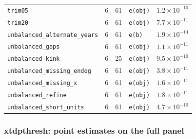 \begin{longtable}{@{}p{3.6cm}rrp{4.9cm}r@{}}
\texttt{trim05} & 6 & 61 & \texttt{e(obj)} & $1.2\times10^{-10}$ \\
\texttt{trim20} & 6 & 61 & \texttt{e(obj)} & $7.7\times10^{-11}$ \\
\texttt{unbalanced\_\allowbreak{}alternate\_\allowbreak{}years} & 6 & 61 & \texttt{e(b)} & $1.9\times10^{-14}$ \\
\texttt{unbalanced\_\allowbreak{}gaps} & 6 & 61 & \texttt{e(obj)} & $1.1\times10^{-11}$ \\
\texttt{unbalanced\_\allowbreak{}kink} & 6 & 25 & \texttt{e(obj)} & $9.5\times10^{-10}$ \\
\texttt{unbalanced\_\allowbreak{}missing\_\allowbreak{}endog} & 6 & 61 & \texttt{e(obj)} & $3.8\times10^{-11}$ \\
\texttt{unbalanced\_\allowbreak{}missing\_\allowbreak{}x} & 6 & 61 & \texttt{e(obj)} & $1.6\times10^{-11}$ \\
\texttt{unbalanced\_\allowbreak{}refine} & 6 & 61 & \texttt{e(obj)} & $1.8\times10^{-11}$ \\
\texttt{unbalanced\_\allowbreak{}short\_\allowbreak{}units} & 6 & 61 & \texttt{e(obj)} & $4.7\times10^{-10}$ \\
\bottomrule
\end{longtable}

\subsubsection*{xtdpthresh: point estimates on the full panel}

